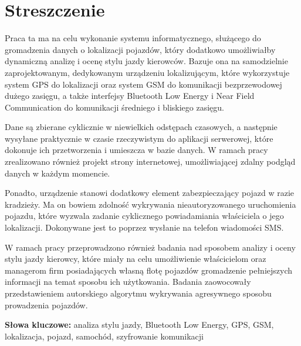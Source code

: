 

\chapter*{Streszczenie}
{
\flushbottom


\begin{singlespacing}

Praca ta ma na celu wykonanie systemu informatycznego, służącego do gromadzenia danych o lokalizacji pojazdów, który dodatkowo umożliwiałby dynamiczną analizę i ocenę stylu jazdy kierowców. Bazuje ona na samodzielnie zaprojektowanym, dedykowanym urządzeniu lokalizującym, które wykorzystuje system GPS do lokalizacji oraz system GSM do komunikacji bezprzewodowej dużego zasięgu, a także interfejsy Bluetooth Low Energy i Near Field Communication do komunikacji średniego i bliskiego zasięgu. 

Dane są zbierane cyklicznie w niewielkich odstępach czasowych, a następnie wysyłane praktycznie w czasie rzeczywistym do aplikacji serwerowej, które dokonuje ich przetworzenia i umieszcza w bazie danych. W ramach pracy zrealizowano również projekt strony internetowej, umożliwiającej zdalny podgląd danych w każdym momencie. 

Ponadto, urządzenie stanowi dodatkowy element zabezpieczający pojazd w razie kradzieży. Ma on bowiem zdolność wykrywania nieautoryzowanego uruchomienia pojazdu, które wyzwala zadanie cyklicznego powiadamiania właściciela o jego lokalizacji. Dokonywane jest to poprzez wysłanie na telefon  wiadomości SMS. 

W ramach pracy przeprowadzono również badania nad sposobem analizy i oceny stylu jazdy kierowcy, które miały na celu umożliwienie właścicielom oraz managerom firm posiadających własną flotę pojazdów gromadzenie pełniejszych informacji na temat sposobu ich użytkowania. Badania zaowocowały przedstawieniem autorskiego algorytmu wykrywania agresywnego sposobu prowadzenia pojazdów.

\textbf{Słowa kluczowe: }analiza stylu jazdy, Bluetooth Low Energy, GPS, GSM, lokalizacja, pojazd, samochód, szyfrowanie komunikacji

\end{singlespacing}
}

\clearpage

